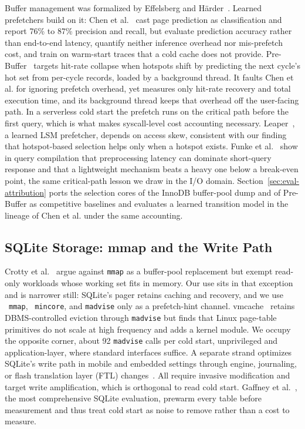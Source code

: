 \documentclass[sigconf, nonacm]{acmart}
\begin{document}
Buffer management was formalized by Effelsberg and Härder~\cite{Effelsberg1984}. Learned prefetchers build on it: Chen et al.~\cite{Chen2021} cast page prediction as classification and report 76\% to 87\% precision and recall, but evaluate prediction accuracy rather than end-to-end latency, quantify neither inference overhead nor mis-prefetch cost, and train on warm-start traces that a cold cache does not provide. Pre-Buffer~\cite{Yi2026} targets hit-rate collapse when hotspots shift by predicting the next cycle's hot set from per-cycle records, loaded by a background thread. It faults Chen et al. for ignoring prefetch overhead, yet measures only hit-rate recovery and total execution time, and its background thread keeps that overhead off the user-facing path. In a serverless cold start the prefetch runs on the critical path before the first query, which is what makes syscall-level cost accounting necessary. Leaper~\cite{Yang2020}, a learned LSM prefetcher, depends on access skew, consistent with our finding that hotspot-based selection helps only when a hotspot exists. Funke et al.~\cite{Funke2022} show in query compilation that preprocessing latency can dominate short-query response and that a lightweight mechanism beats a heavy one below a break-even point, the same critical-path lesson we draw in the I/O domain. Section~\ref{sec:eval-attribution} ports the selection cores of the InnoDB buffer-pool dump and of Pre-Buffer as competitive baselines and evaluates a learned transition model in the lineage of Chen et al. under the same accounting.

\subsection{SQLite Storage: mmap and the Write Path}\label{sec:write-path}

Crotty et al.~\cite{Crotty2022} argue against \texttt{mmap} as a buffer-pool replacement but exempt read-only workloads whose working set fits in memory. Our use sits in that exception and is narrower still: SQLite's pager retains caching and recovery, and we use ~\texttt{mmap}, ~\texttt{mincore}, and \texttt{madvise} only as a prefetch-hint channel. vmcache~\cite{Leis2023} retains DBMS-controlled eviction through \texttt{madvise} but finds that Linux page-table primitives do not scale at high frequency and adds a kernel module. We occupy the opposite corner, about 92 \texttt{madvise} calls per cold start, unprivileged and application-layer, where standard interfaces suffice. A separate strand optimizes SQLite's write path in mobile and embedded settings through engine, journaling, or flash translation layer (FTL) changes~\cite{Jeong2013, Kang2013, Kim2012, Oh2015}. All require invasive modification and target write amplification, which is orthogonal to read cold start. Gaffney et al.~\cite{Gaffney2022}, the most comprehensive SQLite evaluation, prewarm every table before measurement and thus treat cold start as noise to remove rather than a cost to measure.
\end{document}
